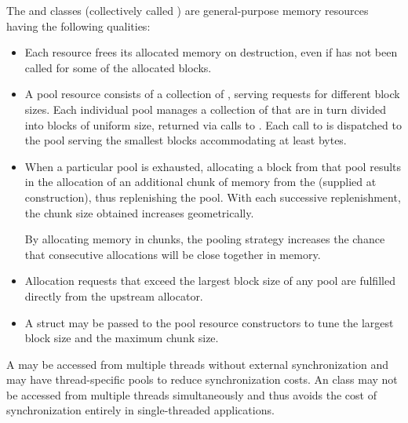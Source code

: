 \pnum
The  and
 classes
(collectively called )
are general-purpose memory resources having the following qualities:
\begin{itemize}
\item
Each resource frees its allocated memory on destruction,
even if  has not been called for some of the allocated blocks.
\item
A pool resource consists of a collection of ,
serving requests for different block sizes.
Each individual pool manages a collection of 
that are in turn divided into blocks of uniform size,
returned via calls to .
Each call to  is dispatched
to the pool serving the smallest blocks accommodating at least  bytes.
\item
When a particular pool is exhausted,
allocating a block from that pool results in the allocation
of an additional chunk of memory from the 
(supplied at construction), thus replenishing the pool.
With each successive replenishment,
the chunk size obtained increases geometrically.
\begin{note}
By allocating memory in chunks,
the pooling strategy increases the chance that consecutive allocations
will be close together in memory.
\end{note}
\item
Allocation requests that exceed the largest block size of any pool
are fulfilled directly from the upstream allocator.
\item
A  struct may be passed to the pool resource constructors
to tune the largest block size and the maximum chunk size.
\end{itemize}

\pnum
A  may be accessed from multiple threads
without external synchronization
and may have thread-specific pools to reduce synchronization costs.
An  class may not be accessed
from multiple threads simultaneously
and thus avoids the cost of synchronization entirely
in single-threaded applications.

